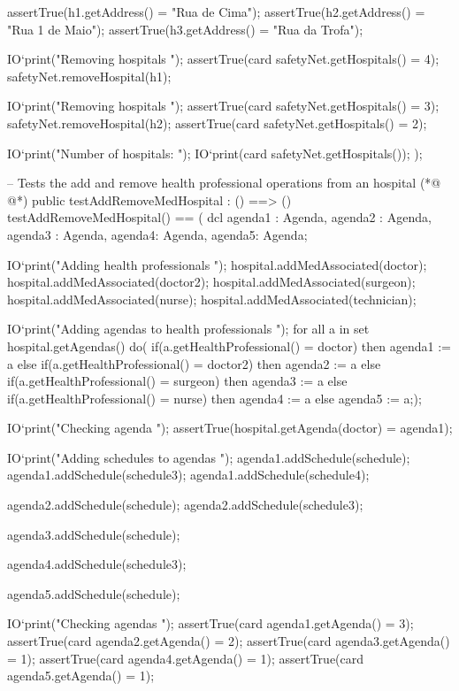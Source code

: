 \begin{vdmpp}[breaklines=true]
      assertTrue(h1.getAddress() = "Rua de Cima");
      assertTrue(h2.getAddress() = "Rua 1 de Maio");
      assertTrue(h3.getAddress() = "Rua da Trofa");
      
      IO`print("\n Removing hospitals \n");
      assertTrue(card safetyNet.getHospitals() = 4);
      safetyNet.removeHospital(h1);
      
      IO`print("\n Removing hospitals \n");
      assertTrue(card safetyNet.getHospitals() = 3);
      safetyNet.removeHospital(h2);
      assertTrue(card safetyNet.getHospitals() = 2);
      
      IO`print("\n Number of hospitals: ");
      IO`print(card safetyNet.getHospitals());
  );
  
  -- Tests the add and remove health professional operations from an hospital
(*@
\label{testAddRemoveMedHospital:97}
@*)
  public testAddRemoveMedHospital : () ==> ()
  testAddRemoveMedHospital() == (
    dcl agenda1 : Agenda, agenda2 : Agenda, agenda3 : Agenda, agenda4: Agenda, agenda5: Agenda;
     
    IO`print("\n Adding health professionals \n");
    hospital.addMedAssociated(doctor);
    hospital.addMedAssociated(doctor2);
    hospital.addMedAssociated(surgeon);
    hospital.addMedAssociated(nurse);
    hospital.addMedAssociated(technician);
   
    IO`print("\n Adding agendas to health professionals \n");
    for all a in set hospital.getAgendas() do(
     if(a.getHealthProfessional() = doctor)
      then agenda1 := a
     else if(a.getHealthProfessional() = doctor2)
      then agenda2 := a
     else if(a.getHealthProfessional() = surgeon)
      then agenda3 := a
     else if(a.getHealthProfessional() = nurse)
      then agenda4 := a
     else
      agenda5 := a;);
     
     IO`print("\n Checking agenda \n"); 
     assertTrue(hospital.getAgenda(doctor) = agenda1);
     
     IO`print("\n Adding schedules to agendas \n"); 
     agenda1.addSchedule(schedule);
     agenda1.addSchedule(schedule3);
     agenda1.addSchedule(schedule4);
     
     agenda2.addSchedule(schedule);
     agenda2.addSchedule(schedule3);
     
     agenda3.addSchedule(schedule);
     
     agenda4.addSchedule(schedule3);
     
     agenda5.addSchedule(schedule);
     
     IO`print("\n Checking agendas \n"); 
     assertTrue(card agenda1.getAgenda() = 3);
     assertTrue(card agenda2.getAgenda() = 2);
     assertTrue(card agenda3.getAgenda() = 1);
     assertTrue(card agenda4.getAgenda() = 1);
     assertTrue(card agenda5.getAgenda() = 1);
     

\end{vdmpp}
